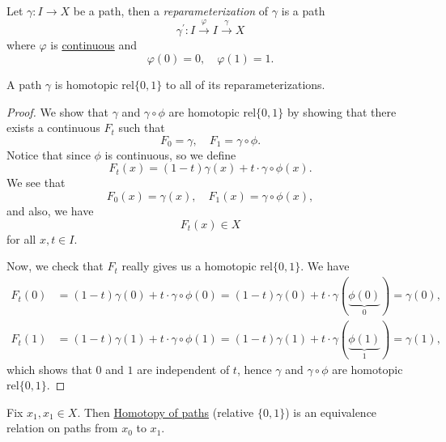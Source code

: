 \begin{definition}[Reparameterization]\label{def:reparameterization}
	Let \(\gamma\colon I\to X\) be a path, then a \emph{reparameterization} of \(\gamma\) is a path
	\[
		\gamma ^\prime \colon I\overset{\varphi }{\longrightarrow} I\overset{\gamma}{\longrightarrow} X
	\]
	where \(\varphi \) is \underline{continuous} and
	\[
		\varphi (0) = 0,\quad \varphi (1) = 1.
	\]
\end{definition}

\begin{exercise}
	A path \(\gamma\) is homotopic \(\mathrm{rel} \{0, 1\}\) to all of its reparameterizations.
\end{exercise}
\begin{proof}
	\par We show that \(\gamma\) and \(\gamma\circ \phi \) are homotopic \(\mathrm{rel} \{0, 1\}\) by showing that there exists a continuous \(F_t\) such that
	\[
		F_0 = \gamma,\quad F_1 = \gamma\circ \phi.
	\]
	Notice that since \(\phi \) is continuous, so we define
	\[
		F_t(x) = (1 - t) \gamma(x) + t\cdot \gamma\circ \phi (x).
	\]
	We see that
	\[
		F_0(x) = \gamma(x),\quad F_1(x) = \gamma\circ \phi (x),
	\]
	and also, we have
	\[
		F_t(x)\in X
	\]
	for all \(x, t\in I\).

	\par Now, we check that \(F_t\) really gives us a homotopic \(\mathrm{rel}\{0, 1\}\). We have
	\[
		\begin{split}
			F_t(0) &= (1 - t)\gamma(0) + t\cdot \gamma\circ \phi (0) = (1 - t)\gamma(0) + t\cdot \gamma(\underbrace{\phi (0)}_{0}) = \gamma(0),\\
			F_t(1) &= (1 - t)\gamma(1) + t\cdot \gamma\circ \phi (1) = (1 - t)\gamma(1) + t\cdot \gamma(\underbrace{\phi (1)}_{1}) = \gamma(1),
		\end{split}
	\]
	which shows that \(0\) and \(1\) are independent of \(t\), hence \(\gamma\) and \(\gamma\circ \phi \) are homotopic \(\mathrm{rel} \{0, 1\}\).
\end{proof}

\begin{exercise}
	Fix \(x_1, x_1\in X\). Then \underline{Homotopy of paths} (relative \(\{0, 1\}\)) is an equivalence relation on paths from \(x_0\) to \(x_1\).
\end{exercise}

